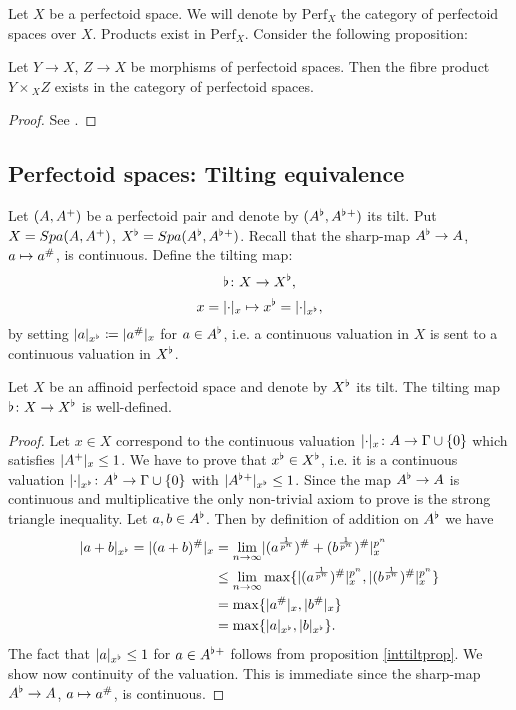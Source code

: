 Let $X$ be a perfectoid space. We will denote by $\mathrm{Perf}_{X}$ the category of perfectoid spaces over $X$.
Products exist in $\mathrm{Perf}_{X}$. Consider the following proposition:

\begin{prop}
Let $Y\to X$, $Z\to X$ be morphisms of perfectoid spaces. Then the fibre product $Y\times\!_{X}Z$
exists in the category of perfectoid spaces.
\end{prop}
\begin{proof}
See \cite[proposition 6.18]{Scholze12}.
\end{proof}


\subsection{Perfectoid spaces: Tilting equivalence}
Let $(A,A{^{+}})$ be a perfectoid pair and denote by $(A^{\flat},A^{\flat}{^{+}})$ its tilt.
Put $X={Spa({A},{A{^{+}}})}$, $X^{\flat}={Spa({A^{\flat}},{A^{\flat}{^{+}}})}$.
Recall that the sharp-map $A^{\flat}\to A$, $a\mapsto a^{\#}$, is continuous.
Define the tilting map:
\[\flat\colon X\to X^{\flat},\]
\[x=\lvert\cdot\rvert_{x}\mapsto x^{\flat}=\lvert\cdot\rvert_{x^{\flat}},\]
by setting $\lvert a\rvert_{x^{\flat}}\coloneqq\lvert a^{\#}\rvert_{x}$ for $a\in A^{\flat}$, i.e. a continuous valuation in $X$ is sent to a continuous valuation in $X^{\flat}$.

\begin{lemma}
Let $X$ be an affinoid perfectoid space and denote by $X^{\flat}$ its tilt.
The tilting map $\flat\colon X\to X^{\flat}$ is well-defined.
\end{lemma}
\begin{proof}
Let $x\in X$ correspond to the continuous valuation $\lvert\cdot\rvert_{x}\colon A\to\Gamma\cup\{0\}$ which satisfies
 $\lvert A{^{+}}\rvert_{x}\leq1$.
We have to prove that $x^{\flat}\in X^{\flat}$, i.e. it is a continuous valuation
$\lvert\cdot\rvert_{x^{\flat}}\colon A^{\flat}\to\Gamma\cup\{0\}$ with $\lvert A^{\flat}{^{+}}\rvert_{x^{\flat}}\leq1$.
Since the map $A^{\flat}\to A$ is continuous and multiplicative the only non-trivial axiom to prove is the strong triangle inequality.
Let $a,b\in A^{\flat}$. Then by definition of addition on $A^{\flat}$ we have
\begin{equation*}
\begin{split}
\lvert a+b\rvert_{x^{\flat}} = \lvert(a+b)^{\#}\rvert_{x} &= \lim_{n\to\infty}\lvert(a^{\frac{1}{p^n}})^{\#} + (b^{\frac{1}{p^n}})^{\#}\rvert_{x}^{p^n} \\
                                                        &\leq  \lim_{n\to\infty}\max\{\lvert(a^{\frac{1}{p^n}})^{\#}\rvert_{x}^{p^n}, \lvert(b^{\frac{1}{p^n}})^{\#}\rvert_{x}^{p^n}\}\\
									 &= \max\{\lvert a^{\#}\rvert_{x}, \lvert b^{\#}\rvert_{x}\}\\
									&= \max\{\lvert a\rvert_{x^{\flat}}, \lvert b\rvert_{x^{\flat}}\}.
\end{split}
\end{equation*}
The fact that $\lvert a\rvert_{x^{\flat}}\leq1$ for $a\in A^{\flat}{^{+}}$ follows from proposition \ref{inttiltprop}.
We show now continuity of the valuation. 
This is immediate since the sharp-map $A^{\flat}\to A$, $a\mapsto a^{\#}$, is continuous.
\end{proof}


